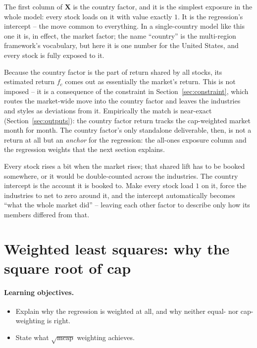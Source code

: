 \documentclass[11pt]{article}
\theoremstyle{definition}
\theoremstyle{plain}
\theoremstyle{remark}
\newcommand{\Xmat}{\mathbf{X}}
\begin{document}
The first column of $\Xmat$ is the country factor, and it is the simplest exposure in the whole model: every stock loads on it with value exactly $1$. It is the regression's intercept -- the move common to everything. In a single-country model like this one it is, in effect, the market factor; the name ``country'' is the multi-region framework's vocabulary, but here it is one number for the United States, and every stock is fully exposed to it.

Because the country factor is the part of return shared by all stocks, its estimated return $f_c$ comes out as essentially the market's return. This is not imposed -- it is a consequence of the constraint in Section~\ref{sec:constraint}, which routes the market-wide move into the country factor and leaves the industries and styles as deviations from it. Empirically the match is near-exact (Section~\ref{sec:outputs}): the country factor return tracks the cap-weighted market month for month. The country factor's only standalone deliverable, then, is not a return at all but an \emph{anchor} for the regression: the all-ones exposure column and the regression weights that the next section explains.

\begin{intuition}
Every stock rises a bit when the market rises; that shared lift has to be booked somewhere, or it would be double-counted across the industries. The country intercept is the account it is booked to. Make every stock load $1$ on it, force the industries to net to zero around it, and the intercept automatically becomes ``what the whole market did'' -- leaving each other factor to describe only how its members differed from that.
\end{intuition}

\section{Weighted least squares: why the square root of cap}\label{sec:wls}

\paragraph{Learning objectives.}
\begin{itemize}[leftmargin=1.4em,topsep=2pt]
  \item Explain why the regression is weighted at all, and why neither equal- nor cap-weighting is right.
  \item State what $\sqrt{\text{mcap}}$ weighting achieves.
\end{itemize}
\end{document}
